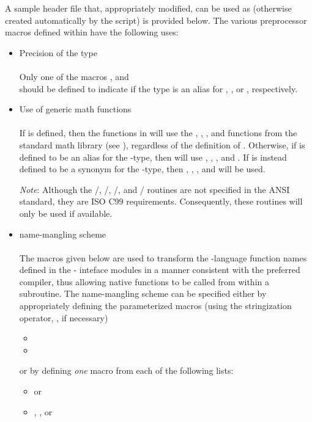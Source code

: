 A sample header file that, appropriately modified, can be used as
 (otherwise created automatically by the
 script) is provided below. The various preprocessor
macros defined within  have the following uses:
\begin{itemize}

\item Precision of the {\sundials}  type\\ \\
  Only one of the macros ,  and \\
   should be defined to indicate if the {\sundials}
   type is an alias for , , or ,
  respectively.

\item Use of generic math functions\\ \\
  If  is defined, then the functions
  in  will use the , ,
  , and  functions from the standard math library
  (see ), regardless of the definition of .
  Otherwise, if  is defined to be an alias for the
   {\C}-type, then {\sundials} will use ,
  , , and .  If  is instead
  defined to be a synonym for the  {\C}-type, then
  , , , and  will be used.

  {\em Note}: Although the /, /,
  /, and / routines are not
  specified in the ANSI {\C} standard, they are ISO C99 requirements.
  Consequently, these routines will only be used if available.

\item {\F} name-mangling scheme\\ \\
  The macros given below are used to transform the {\C}-language
  function names defined in the {\F}-{\C} inteface modules in a manner
  consistent with the preferred {\F} compiler, thus allowing native
  {\C} functions to be called from within a {\F} subroutine. The
  name-mangling scheme can be specified either by appropriately
  defining the parameterized macros (using the stringization operator,
  \id{\#\#}, if necessary)
  \begin{itemize}
  \item {}
  \item {}
  \end{itemize}
  or by defining {\em one} macro from each of the following lists:
  \begin{itemize}
  \item {} or 
  \item {}, , or
  \end{itemize}


\end{itemize}
